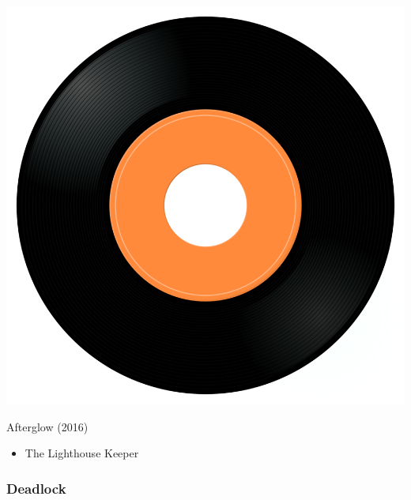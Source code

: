 \begin{minipage}[t]{0.25\textwidth}\vspace{0pt}
\captionsetup{type=figure}
\includegraphics[width=\textwidth]{Images/cover.png}
\caption*{Afterglow (2016)}
\end{minipage}
\begin{minipage}[t]{0.25\textwidth}\vspace{0pt}
\begin{itemize}[nosep,leftmargin=1em,labelwidth=*,align=left]
	\setlength{\itemsep}{0pt}
	\item The Lighthouse Keeper
\end{itemize}
\end{minipage}

\subsubsection{Deadlock}

